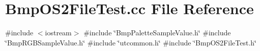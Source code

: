 \section{Bmp\+O\+S2\+File\+Test.\+cc File Reference}
\label{BmpOS2FileTest_8cc}
{\ttfamily \#include $<$iostream$>$}\newline
{\ttfamily \#include \char`\"{}Bmp\+Palette\+Sample\+Value.\+h\char`\"{}}\newline
{\ttfamily \#include \char`\"{}Bmp\+R\+G\+B\+Sample\+Value.\+h\char`\"{}}\newline
{\ttfamily \#include \char`\"{}utcommon.\+h\char`\"{}}\newline
{\ttfamily \#include \char`\"{}Bmp\+O\+S2\+File\+Test.\+h\char`\"{}}\newline
